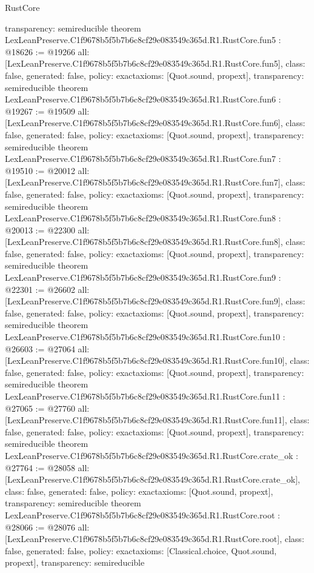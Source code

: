 \begin{lexlean}{RustCore}
\begin{coremodule}
{  transparency: semireducible
}
theorem LexLeanPreserve.C1f9678b5f5b7b6c8cf29e083549c365d.R1.RustCore.fun5 : @18626 := @19266 {
  all: [LexLeanPreserve.C1f9678b5f5b7b6c8cf29e083549c365d.R1.RustCore.fun5],
  class: false,
  generated: false,
  policy: exact{axioms: [Quot.sound, propext]},
  transparency: semireducible
}
theorem LexLeanPreserve.C1f9678b5f5b7b6c8cf29e083549c365d.R1.RustCore.fun6 : @19267 := @19509 {
  all: [LexLeanPreserve.C1f9678b5f5b7b6c8cf29e083549c365d.R1.RustCore.fun6],
  class: false,
  generated: false,
  policy: exact{axioms: [Quot.sound, propext]},
  transparency: semireducible
}
theorem LexLeanPreserve.C1f9678b5f5b7b6c8cf29e083549c365d.R1.RustCore.fun7 : @19510 := @20012 {
  all: [LexLeanPreserve.C1f9678b5f5b7b6c8cf29e083549c365d.R1.RustCore.fun7],
  class: false,
  generated: false,
  policy: exact{axioms: [Quot.sound, propext]},
  transparency: semireducible
}
theorem LexLeanPreserve.C1f9678b5f5b7b6c8cf29e083549c365d.R1.RustCore.fun8 : @20013 := @22300 {
  all: [LexLeanPreserve.C1f9678b5f5b7b6c8cf29e083549c365d.R1.RustCore.fun8],
  class: false,
  generated: false,
  policy: exact{axioms: [Quot.sound, propext]},
  transparency: semireducible
}
theorem LexLeanPreserve.C1f9678b5f5b7b6c8cf29e083549c365d.R1.RustCore.fun9 : @22301 := @26602 {
  all: [LexLeanPreserve.C1f9678b5f5b7b6c8cf29e083549c365d.R1.RustCore.fun9],
  class: false,
  generated: false,
  policy: exact{axioms: [Quot.sound, propext]},
  transparency: semireducible
}
theorem LexLeanPreserve.C1f9678b5f5b7b6c8cf29e083549c365d.R1.RustCore.fun10 : @26603 := @27064 {
  all: [LexLeanPreserve.C1f9678b5f5b7b6c8cf29e083549c365d.R1.RustCore.fun10],
  class: false,
  generated: false,
  policy: exact{axioms: [Quot.sound, propext]},
  transparency: semireducible
}
theorem LexLeanPreserve.C1f9678b5f5b7b6c8cf29e083549c365d.R1.RustCore.fun11 : @27065 := @27760 {
  all: [LexLeanPreserve.C1f9678b5f5b7b6c8cf29e083549c365d.R1.RustCore.fun11],
  class: false,
  generated: false,
  policy: exact{axioms: [Quot.sound, propext]},
  transparency: semireducible
}
theorem LexLeanPreserve.C1f9678b5f5b7b6c8cf29e083549c365d.R1.RustCore.crate_ok : @27764 := @28058 {
  all: [LexLeanPreserve.C1f9678b5f5b7b6c8cf29e083549c365d.R1.RustCore.crate_ok],
  class: false,
  generated: false,
  policy: exact{axioms: [Quot.sound, propext]},
  transparency: semireducible
}
theorem LexLeanPreserve.C1f9678b5f5b7b6c8cf29e083549c365d.R1.RustCore.root : @28066 := @28076 {
  all: [LexLeanPreserve.C1f9678b5f5b7b6c8cf29e083549c365d.R1.RustCore.root],
  class: false,
  generated: false,
  policy: exact{axioms: [Classical.choice, Quot.sound, propext]},
  transparency: semireducible
}


\end{coremodule}
\end{lexlean}
